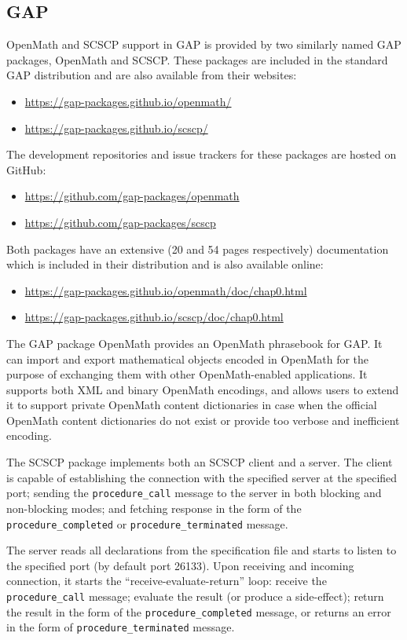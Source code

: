 \documentclass{deliverablereport}
\begin{document}
\subsection{GAP}

OpenMath and SCSCP support in GAP is provided by two similarly named GAP packages, 
{\sf OpenMath} and {\sf SCSCP}. These packages are included in the 
standard GAP distribution and are also available from their 
websites:
\begin{itemize}
\item
\url{https://gap-packages.github.io/openmath/}
\item
\url{https://gap-packages.github.io/scscp/}
\end{itemize}
The development repositories and issue trackers for these packages are hosted on GitHub:
\begin{itemize}
\item
\url{https://github.com/gap-packages/openmath}
\item
\url{https://github.com/gap-packages/scscp}
\end{itemize}
Both packages have an extensive (20 and 54 pages respectively) documentation 
which is included in their distribution and is also available online:
\begin{itemize}
\item
\url{https://gap-packages.github.io/openmath/doc/chap0.html}
\item
\url{https://gap-packages.github.io/scscp/doc/chap0.html}
\end{itemize}

The GAP package OpenMath provides an OpenMath phrasebook for GAP.
It can import and export mathematical objects encoded in OpenMath
for the purpose of exchanging them with other OpenMath-enabled 
applications. It supports both XML and binary OpenMath encodings, 
and allows users to extend it to support private OpenMath content
dictionaries in case when the official OpenMath content dictionaries
do not exist or provide too verbose and inefficient encoding.

The SCSCP package implements both an SCSCP client and a server. 
The client is capable of establishing the connection with the specified server
at the specified port; sending the {\tt procedure\_call} message to
the server in both blocking and non-blocking modes; and fetching
response in the form of the {\tt procedure\_completed} or
{\tt procedure\_terminated} message. 

The server reads all declarations from the specification file and starts
to listen to the specified port (by default port 26133). Upon receiving 
and incoming connection, it starts the ``receive-evaluate-return'' loop:
receive the {\tt procedure\_call} message; evaluate the result 
(or produce a side-effect); return the result in the form of the
{\tt procedure\_completed} message, or returns an error in the form
of {\tt procedure\_terminated} message.
\end{document}
